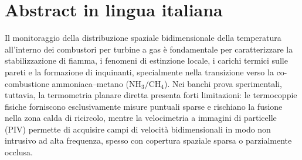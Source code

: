 \documentclass{Configuration_Files/PoliMi3i_thesis}
\begin{document}
\chapter*{Abstract in lingua italiana}
Il monitoraggio della distribuzione spaziale bidimensionale della temperatura all'interno dei combustori per turbine a gas è fondamentale per caratterizzare la stabilizzazione di fiamma, i fenomeni di estinzione locale, i carichi termici sulle pareti e la formazione di inquinanti, specialmente nella transizione verso la co-combustione ammoniaca--metano ($\text{NH}_3/\text{CH}_4$). Nei banchi prova sperimentali, tuttavia, la termometria planare diretta presenta forti limitazioni: le termocoppie fisiche forniscono esclusivamente misure puntuali sparse e rischiano la fusione nella zona calda di ricircolo, mentre la velocimetria a immagini di particelle (PIV) permette di acquisire campi di velocità bidimensionali in modo non intrusivo ad alta frequenza, spesso con copertura spaziale sparsa o parzialmente occlusa.
\end{document}

